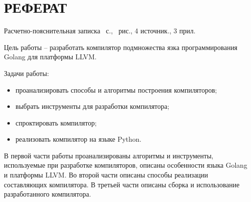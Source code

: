 \section*{РЕФЕРАТ}

Расчетно-пояснительная записка~\pageref{LastPage} с.,
\totalfigures\ рис., 4 источник., 3 прил.

Цель работы – разработать компилятор подмножества язка программирования
Golang для платформы LLVM.

Задачи работы:
\begin{itemize}
    \item проанализировать способы и алгоритмы построения компиляторов;
    \item выбрать инструменты для разработки компилятора;
    \item спроктировать компилятор;
    \item реализовать компилятор на языке Python.
\end{itemize}

В первой части работы проанализированы алгоритмы и инструменты,
используемые при разработке компиляторов, описаны особенности языка
Golang и платформы LLVM. Во второй части описаны способы реализации
составляющих компилятора. В третьей части описаны сборка и использование
разработанного компилятора.
